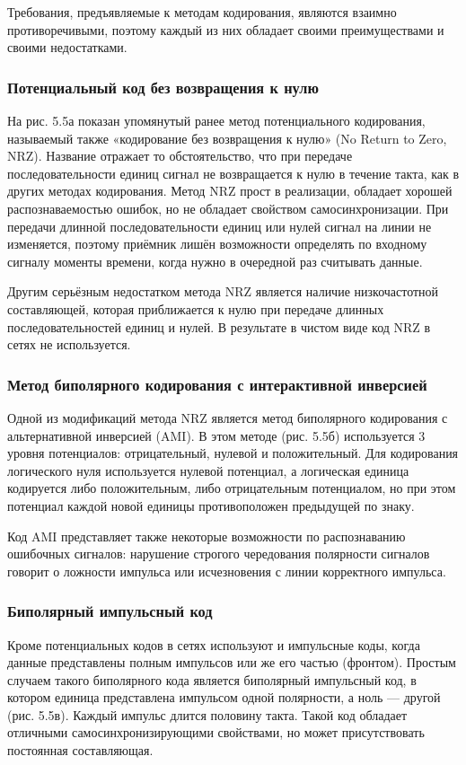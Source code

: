 \documentclass[
	a4paper,
	oneside,
	BCOR = 10mm,
	DIV = 12,
	12pt,
	headings = normal,
]{scrartcl}
\begin{document}
					Требования, предъявляемые к методам кодирования, являются взаимно противоречивыми, поэтому каждый из них обладает своими преимуществами и своими недостатками.

				\subsubsection{Потенциальный код без возвращения к нулю}
					На рис. 5.5а показан упомянутый ранее метод потенциального кодирования, называемый также «кодирование без возвращения к нулю» (\textenglish{No Return to Zero, NRZ}). Название отражает то обстоятельство, что при передаче последовательности единиц сигнал не возвращается к нулю в течение такта, как в других методах кодирования. Метод NRZ прост в реализации, обладает хорошей распознаваемостью ошибок, но не обладает свойством самосинхронизации. При передачи длинной последовательности единиц или нулей сигнал на линии не изменяется, поэтому приёмник лишён возможности определять по входному сигналу моменты времени, когда нужно в очередной раз считывать данные.

					Другим серьёзным недостатком метода NRZ является наличие низкочастотной составляющей, которая приближается к нулю при передаче длинных последовательностей единиц и нулей. В результате в чистом виде код NRZ в сетях не используется.

				\subsubsection{Метод биполярного кодирования с интерактивной инверсией}
					Одной из модификаций метода NRZ является метод биполярного кодирования с альтернативной инверсией (\textenglish{AMI}). В этом методе (рис. 5.5б) используется 3 уровня потенциалов: отрицательный, нулевой и положительный. Для кодирования логического нуля используется нулевой потенциал, а логическая единица кодируется либо положительным, либо отрицательным потенциалом, но при этом потенциал каждой новой единицы противоположен предыдущей по знаку. 

					Код \textenglish{AMI} представляет также некоторые возможности по распознаванию ошибочных сигналов: нарушение строгого чередования полярности сигналов говорит о ложности импульса или исчезновения с линии корректного импульса. 

				\subsubsection{Биполярный импульсный код}
					Кроме потенциальных кодов в сетях используют и импульсные коды, когда данные представлены полным импульсов или же его частью (фронтом). Простым случаем такого биполярного кода является биполярный импульсный код, в котором единица представлена импульсом одной полярности, а ноль — другой (рис. 5.5в). Каждый импульс длится половину такта. Такой код обладает отличными самосинхронизирующими свойствами, но может присутствовать постоянная составляющая.
\end{document}
